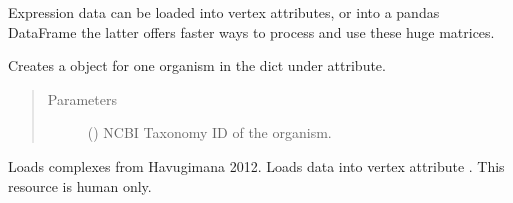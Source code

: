 \documentclass[letterpaper,10pt,english]{sphinxmanual}
\begin{document}
\begin{fulllineitems}
\begin{fulllineitems}
\end{fulllineitems}


\begin{fulllineitems}
\label{\detokenize{reference:pypath.main.PyPath.load_expression}}
Expression data can be loaded into vertex attributes,
or into a pandas DataFrame \textendash{} the latter offers faster
ways to process and use these huge matrices.

\end{fulllineitems}


\begin{fulllineitems}
\label{\detokenize{reference:pypath.main.PyPath.load_go}}
Creates a  object for one organism in the
dict under  attribute.
\begin{quote}\begin{description}
\item[{Parameters}] \leavevmode
{} () \textendash{} NCBI Taxonomy ID of the organism.

\end{description}\end{quote}

\end{fulllineitems}


\begin{fulllineitems}
\label{\detokenize{reference:pypath.main.PyPath.load_havugimana}}
Loads complexes from Havugimana 2012. Loads data into vertex attribute
.
This resource is human only.

\end{fulllineitems}


\end{fulllineitems}
\end{document}
